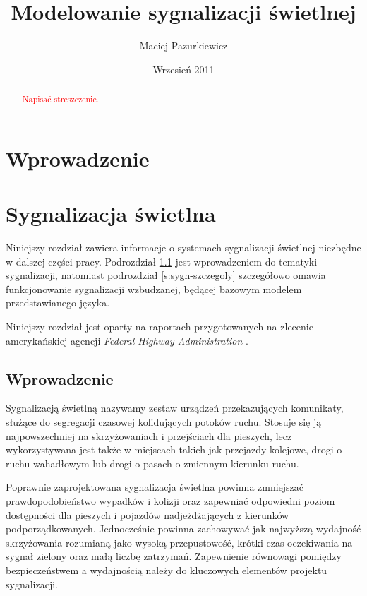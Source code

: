 \documentclass{pracamgr}
\author{Maciej Pazurkiewicz}
\title{Modelowanie sygnalizacji świetlnej}
\date{Wrzesień 2011}
\newcommand{\todo}[1]{\textcolor{red}{#1}}
\theoremstyle{plain}
\begin{document}
\maketitle

\begin{abstract}
  \todo{Napisać streszczenie.}
\end{abstract}

\tableofcontents

\chapter*{Wprowadzenie} 

\chapter{Sygnalizacja świetlna}
\label{c:sygnalizacja}

Niniejszy rozdział zawiera informacje o systemach sygnalizacji
świetlnej niezbędne w dalszej części pracy. Podrozdział
\ref{s:sygn-wprowadzenie} jest wprowadzeniem do tematyki sygnalizacji,
natomiast podrozdział \ref{s:sygn-szczegoly} szczegółowo omawia
funkcjonowanie sygnalizacji wzbudzanej, będącej bazowym modelem
przedstawianego języka.

Niniejszy rozdział jest oparty na raportach przygotowanych na zlecenie
amerykańskiej agencji \emph{Federal Highway Administration}
\cite{fhwa:handbook06} \cite{fhwa:timing08}.

\section{Wprowadzenie}
\label{s:sygn-wprowadzenie}

Sygnalizacją świetlną nazywamy zestaw urządzeń przekazujących
komunikaty, służące do segregacji czasowej kolidujących potoków
ruchu. Stosuje się ją najpowszechniej na skrzyżowaniach i przejściach
dla pieszych, lecz wykorzystywana jest także w miejscach takich jak
przejazdy kolejowe, drogi o ruchu wahadłowym lub drogi o pasach o
zmiennym kierunku ruchu.

Poprawnie zaprojektowana sygnalizacja świetlna powinna zmniejszać
prawdopodobieństwo wypadków i kolizji oraz zapewniać odpowiedni poziom
dostępności dla pieszych i pojazdów nadjeżdżających z kierunków
podporządkowanych. Jednocześnie powinna zachowywać jak najwyższą
wydajność skrzyżowania rozumianą jako wysoką przepustowość, krótki
czas oczekiwania na sygnał zielony oraz małą liczbę
zatrzymań. Zapewnienie równowagi pomiędzy bezpieczeństwem a wydajnością
należy do kluczowych elementów projektu sygnalizacji.
\end{document}
